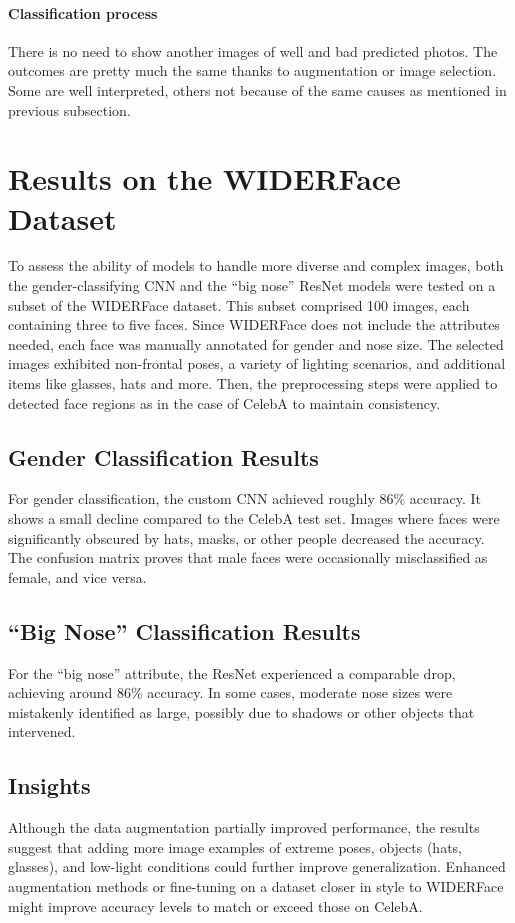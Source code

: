 \documentclass{article}
\begin{document}
\paragraph{Classification process}
There is no need to show another images of well and bad predicted photos. The outcomes are pretty much the same thanks to augmentation or image selection. Some are well interpreted, others not because of the same causes as mentioned in previous subsection.

\vspace{0.2cm}
\section{Results on the WIDERFace Dataset}

To assess the ability of models to handle more diverse and complex images, both the gender-classifying CNN and the “big nose” ResNet models were tested on a subset of the WIDERFace dataset. This subset comprised 100 images, each containing three to five faces. Since WIDERFace does not include the attributes needed, each face was manually annotated for gender and nose size.
The selected images exhibited non-frontal poses, a variety of lighting scenarios, and additional items like glasses, hats and more. Then, the preprocessing steps were applied to detected face regions as in the case of CelebA to maintain consistency.

\subsection{Gender Classification Results}
For gender classification, the custom CNN achieved roughly 86\% accuracy. It shows a small decline compared to the CelebA test set. Images where faces were significantly obscured by hats, masks, or other people decreased the accuracy. The confusion matrix proves that male faces were occasionally misclassified as female, and vice versa.

\subsection{“Big Nose” Classification Results}
For the “big nose” attribute, the ResNet experienced a comparable drop, achieving around 86\% accuracy. In some cases, moderate nose sizes were mistakenly identified as large, possibly due to shadows or other objects that intervened.

\subsection{Insights}
Although the data augmentation partially improved performance, the results suggest that adding more image examples of extreme poses, objects (hats, glasses), and low-light conditions could further improve generalization. Enhanced augmentation methods or fine-tuning on a dataset closer in style to WIDERFace might improve accuracy levels to match or exceed those on CelebA.
\end{document}

